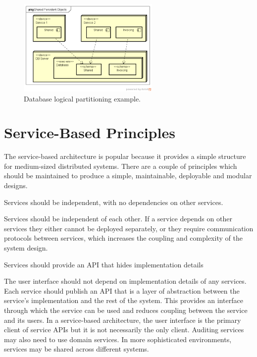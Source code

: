 \begin{figure}[h!]
    \centering
    \includegraphics[trim=38 37 20 44,clip,width=0.61\textwidth]{diagrams/db-logical-partitioning.png}
    \caption{Database logical partitioning example.}
    \label{fig:db-logical-partitioning}
\end{figure}

\section{Service-Based Principles}
The service-based architecture is popular because it provides a simple structure for medium-sized distributed systems.
There are a couple of principles which should be maintained to produce a simple, maintainable, deployable and modular designs.

\vspace{1mm}
\begin{definition}\label{independent-service}
    Services should be independent, with no dependencies on other services.
\end{definition}

Services should be independent of each other.
If a service depends on other services they either cannot be deployed separately,
or they require communication protocols between services, which increases the coupling and complexity of the system design.

\vspace{1mm}
\begin{definition}\label{api-abstraction}
    Services should provide an API that hides implementation details
\end{definition}

The user interface should not depend on implementation details of any services.
Each service should publish an API that is a layer of abstraction between the service's implementation and the rest of the system.
This provides an interface through which the service can be used and reduces coupling between the service and its users.
In a service-based architecture, the user interface is the primary client of service APIs but it is not necessarily the only client.
Auditing services may also need to use domain services.
In more sophisticated environments, services may be shared across different systems.


